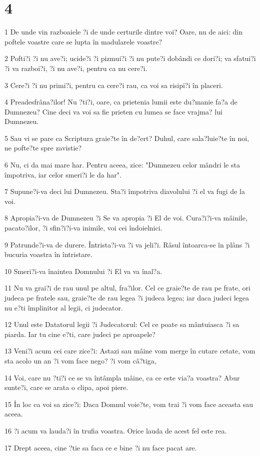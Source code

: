 \chapter{4}

\par 1 De unde vin razboaiele ?i de unde certurile dintre voi? Oare, nu de aici: din poftele voastre care se lupta în madularele voastre?
\par 2 Pofti?i ?i nu ave?i; ucide?i ?i pizmui?i ?i nu pute?i dobândi ce dori?i; va sfatui?i ?i va razboi?i, ?i nu ave?i, pentru ca nu cere?i.
\par 3 Cere?i ?i nu primi?i, pentru ca cere?i rau, ca voi sa risipi?i în placeri.
\par 4 Preadesfrâna?ilor! Nu ?ti?i, oare, ca prietenia lumii este du?manie fa?a de Dumnezeu? Cine deci va voi sa fie prieten cu lumea se face vrajma? lui Dumnezeu.
\par 5 Sau vi se pare ca Scriptura graie?te în de?ert? Duhul, care sala?luie?te în noi, ne pofte?te spre zavistie?
\par 6 Nu, ci da mai mare har. Pentru aceea, zice: "Dumnezeu celor mândri le sta împotriva, iar celor smeri?i le da har".
\par 7 Supune?i-va deci lui Dumnezeu. Sta?i împotriva diavolului ?i el va fugi de la voi.
\par 8 Apropia?i-va de Dumnezeu ?i Se va apropia ?i El de voi. Cura?i?i-va mâinile, pacato?ilor, ?i sfin?i?i-va inimile, voi cei îndoielnici.
\par 9 Patrunde?i-va de durere. Întrista?i-va ?i va jeli?i. Râsul întoarca-se în plâns ?i bucuria voastra în întristare.
\par 10 Smeri?i-va înaintea Domnului ?i El va va înal?a.
\par 11 Nu va grai?i de rau unul pe altul, fra?ilor. Cel ce graie?te de rau pe frate, ori judeca pe fratele sau, graie?te de rau legea ?i judeca legea; iar daca judeci legea nu e?ti împlinitor al legii, ci judecator.
\par 12 Unul este Datatorul legii ?i Judecatorul: Cel ce poate sa mântuiasca ?i sa piarda. Iar tu cine e?ti, care judeci pe aproapele?
\par 13 Veni?i acum cei care zice?i: Astazi sau mâine vom merge în cutare cetate, vom sta acolo un an ?i vom face nego? ?i vom câ?tiga,
\par 14 Voi, care nu ?ti?i ce se va întâmpla mâine, ca ce este via?a voastra? Abur sunte?i, care se arata o clipa, apoi piere.
\par 15 În loc ca voi sa zice?i: Daca Domnul voie?te, vom trai ?i vom face aceasta sau aceea.
\par 16 ?i acum va lauda?i în trufia voastra. Orice lauda de acest fel este rea.
\par 17 Drept aceea, cine ?tie sa faca ce e bine ?i nu face pacat are.

